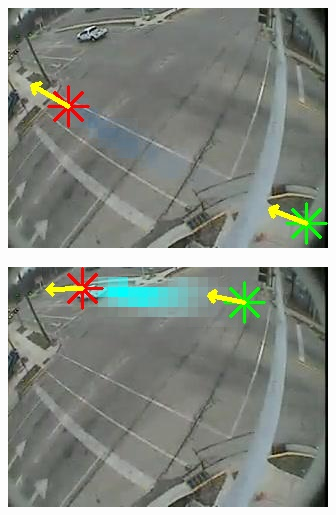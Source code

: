 \begin{figure}
\begin{subfigure}{0.32\linewidth}
            \includegraphics[width=\linewidth]{./img/scene_learning/res/intersection_4/intersection_4-6.jpg}
        \end{subfigure}
        \begin{subfigure}{0.32\linewidth}
            \includegraphics[width=\linewidth]{./img/scene_learning/res/intersection_4/intersection_4-7.jpg}
        \end{subfigure}
        \begin{subfigure}{0.32\linewidth}

\end{subfigure}
\end{figure}
